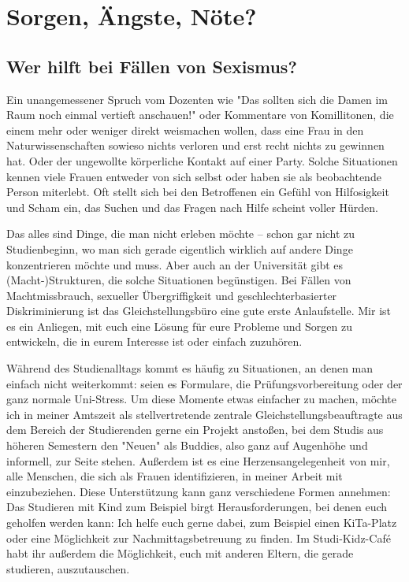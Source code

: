 \section{Sorgen, Ängste, Nöte?}
\subsection{Wer hilft bei Fällen von Sexismus?}

\begin{multicols}{2}
Ein unangemessener Spruch vom Dozenten wie "Das sollten sich die Damen im Raum noch einmal vertieft anschauen!" oder Kommentare von Komillitonen, die einem mehr oder weniger direkt weismachen wollen, dass eine Frau in den Naturwissenschaften sowieso nichts verloren und erst recht nichts zu gewinnen hat. Oder der ungewollte körperliche Kontakt auf einer Party. Solche Situationen kennen viele Frauen entweder von sich selbst oder haben sie als beobachtende Person miterlebt. Oft stellt sich bei den Betroffenen ein Gefühl von Hilfosigkeit und Scham ein, das Suchen und das Fragen nach Hilfe scheint voller Hürden. 

Das alles sind Dinge, die man nicht erleben möchte – schon gar nicht zu Studienbeginn, wo man sich gerade eigentlich wirklich auf andere Dinge konzentrieren möchte und muss. Aber auch an der Universität gibt es (Macht-)Strukturen, die solche Situationen begünstigen. 
Bei Fällen von Machtmissbrauch, sexueller Übergriffigkeit und geschlechterbasierter Diskriminierung ist das Gleichstellungsbüro eine gute erste Anlaufstelle. Mir ist es ein Anliegen, mit euch eine Lösung für eure Probleme und Sorgen zu entwickeln, die in eurem Interesse ist oder einfach zuzuhören. 

Während des Studienalltags kommt es häufig zu Situationen, an denen man einfach nicht weiterkommt: seien es Formulare, die Prüfungsvorbereitung oder der ganz normale Uni-Stress. Um diese Momente etwas einfacher zu machen, möchte ich in meiner Amtszeit als stellvertretende zentrale Gleichstellungsbeauftragte aus dem Bereich der Studierenden gerne ein Projekt anstoßen, bei dem Studis aus höheren Semestern den "Neuen" als Buddies, also ganz auf Augenhöhe und informell, zur Seite stehen. 
Außerdem ist es eine Herzensangelegenheit von mir, alle Menschen, die sich als Frauen identifizieren, in meiner Arbeit mit einzubeziehen. 
Diese Unterstützung kann ganz verschiedene Formen annehmen: Das Studieren mit Kind zum Beispiel birgt Herausforderungen, bei denen euch geholfen werden kann: Ich helfe euch gerne dabei, zum Beispiel einen KiTa-Platz oder eine Möglichkeit zur Nachmittagsbetreuung zu finden. Im Studi-Kidz-Café habt ihr außerdem die Möglichkeit, euch mit anderen Eltern, die gerade studieren, auszutauschen. 


\end{multicols}
